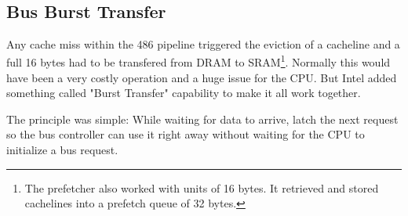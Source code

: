 \par
{}
\par
{}\\
\par




\subsection{Bus Burst Transfer}
Any cache miss within the 486 pipeline triggered the eviction of a cacheline and a full 16 bytes had to be transfered from DRAM to SRAM\footnote{The prefetcher also worked with units of 16 bytes. It retrieved and stored cachelines into a prefetch queue of 32 bytes.}. Normally this would have been a very costly operation and a huge issue for the CPU. But Intel added something called "Burst Transfer" capability to make it all work together.\\
\par
The principle was simple: While waiting for data to arrive, latch the next request so the bus controller can use it right away without waiting for the CPU to initialize a bus request.\\
\par
{}







